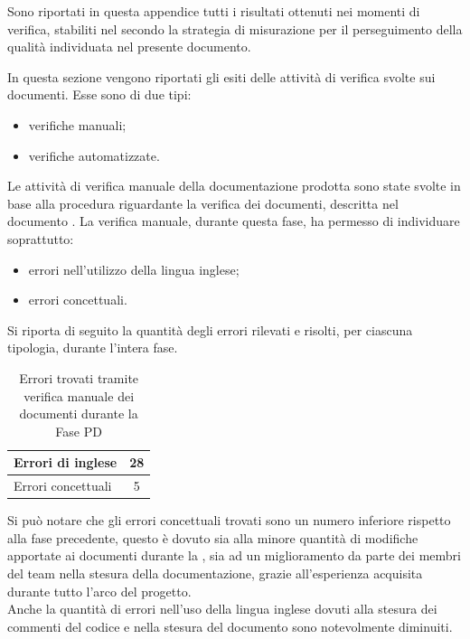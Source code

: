 
Sono riportati in questa appendice tutti i risultati
ottenuti nei momenti di verifica, stabiliti nel  secondo la strategia di misurazione per il perseguimento della qualità
individuata nel presente documento.

		In questa sezione vengono riportati gli esiti delle attività di verifica svolte sui documenti. Esse sono di due tipi:
		\begin{itemize}
			\item verifiche manuali;
			\item verifiche automatizzate.
		\end{itemize}
			Le attività di verifica manuale della documentazione prodotta sono state svolte in base alla procedura riguardante la verifica dei documenti, descritta nel documento .
			La verifica manuale, durante questa fase, ha permesso di individuare soprattutto:
			\begin{itemize}
			\item errori nell'utilizzo della lingua inglese;
			\item errori concettuali.
			\end{itemize}
			Si riporta di seguito la quantità degli errori rilevati e risolti, per ciascuna tipologia, durante l'intera fase.
			\begin{table}[H]
				\centering
					\begin{tabu}{| l | c |} \hline
						Errori di inglese & 28\\ \hline
						Errori concettuali & 5 \\ \hline
					\end{tabu}
					\caption{Errori trovati tramite verifica manuale dei documenti durante la Fase PD}
			\end{table}
			Si può notare che gli errori concettuali trovati sono un numero inferiore rispetto alla fase precedente, questo è dovuto sia alla minore quantità di modifiche apportate ai documenti durante la , sia ad un miglioramento da parte dei membri del team nella stesura della documentazione, grazie all'esperienza acquisita durante tutto l'arco del progetto.\\
			Anche la quantità di errori nell'uso della lingua inglese dovuti alla stesura dei commenti del codice e nella stesura del documento  sono notevolmente diminuiti.

